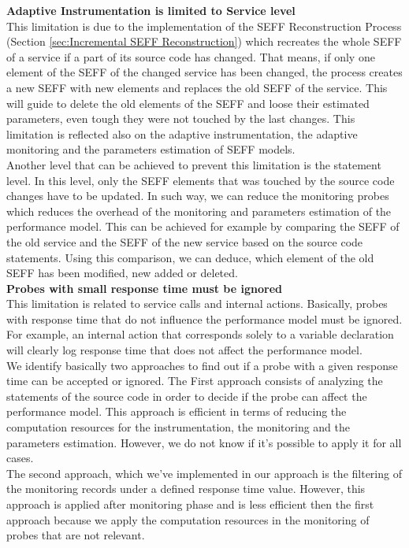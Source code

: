 \textbf{Adaptive Instrumentation is limited to Service level}\\
This limitation is due to the implementation of the SEFF Reconstruction Process (Section \ref{sec:Incremental SEFF Reconstruction}) which recreates the whole SEFF of a service if a part of its source code has changed. That means, if only one element of the SEFF of the changed service has been changed, the process creates a new SEFF with new elements and replaces the old SEFF of the service. This will guide to delete the old elements of the SEFF and loose their estimated parameters, even tough they were not touched by the last changes. This limitation is reflected also on the adaptive instrumentation, the adaptive monitoring and the parameters estimation of SEFF models.\\ 

Another level that can be achieved to prevent this limitation is the statement level. In this level, only the SEFF elements that was touched by the source code changes have to be updated. In such way, we can reduce the monitoring probes which reduces the overhead of the monitoring and parameters estimation of the performance model. This can be achieved for example by comparing the SEFF of the old service and the SEFF of the new service based on the source code statements. Using this comparison, we can deduce, which element of the old SEFF has been modified, new added or deleted.  \\

\textbf{Probes with small response time must be ignored}\\
This limitation is related to service calls and internal actions. Basically, probes with response time that do not influence the performance model must be ignored. For example, an internal action that corresponds solely to a variable declaration will clearly log response time that does not affect the performance model.\\
 
We identify basically two approaches to find out if a probe with a given response time can be accepted or ignored. The First approach consists of analyzing the statements of the source code in order to decide if the probe can affect the performance model. This approach is efficient in terms of reducing the computation resources for the instrumentation, the monitoring and the parameters estimation.  However, we do not know if it's possible to apply it for all cases.\\

The second approach, which we've implemented in our approach is the filtering of the monitoring records under a defined response time value. However, this approach is applied after monitoring phase and is less efficient then the first approach because we apply the computation resources in the monitoring of probes that are not relevant. \\

